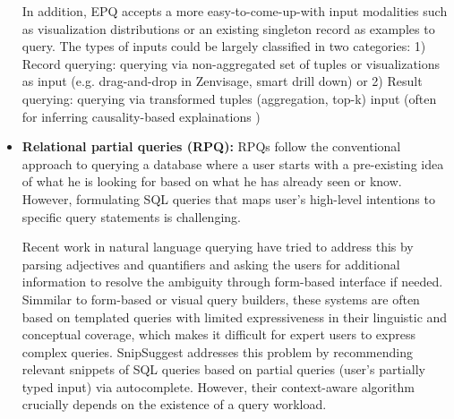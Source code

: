\documentclass{sig-alternate-05-2015}
\begin{document}
\begin{itemize}
\par In addition, EPQ accepts a more easy-to-come-up-with input modalities such as visualization distributions or an existing singleton record as examples to query. The types of inputs could be largely classified in two categories: 1) Record querying: querying via non-aggregated set of tuples or visualizations as input (e.g. drag-and-drop in Zenvisage, smart drill down) or 2) Result querying: querying via transformed tuples (aggregation, top-k) input (often for inferring causality-based explainations \cite{Chapman2009,Wu2013,Roy2015})
\item \textbf{Relational partial queries (RPQ):} RPQs follow the  conventional approach to querying a database where a user starts with a pre-existing idea of what he is looking for based on what he has already seen or know. However, formulating SQL queries that maps user's high-level intentions to specific query statements is challenging. 
\par Recent work in natural language querying have tried to address this by parsing adjectives and quantifiers and asking the users for additional information to resolve the ambiguity through form-based interface if needed. Simmilar to form-based or visual query builders\cite{Abouzied2012}, these systems are often based on templated queries with limited expressiveness in their linguistic and conceptual coverage, which makes it difficult for expert users to express complex queries. SnipSuggest addresses this problem by recommending relevant snippets of SQL queries based on partial queries (user’s partially typed input) via autocomplete\cite{Khoussainova2010}. However, their context-aware algorithm crucially depends on the existence of a query workload. 

\end{itemize}
\end{document}
